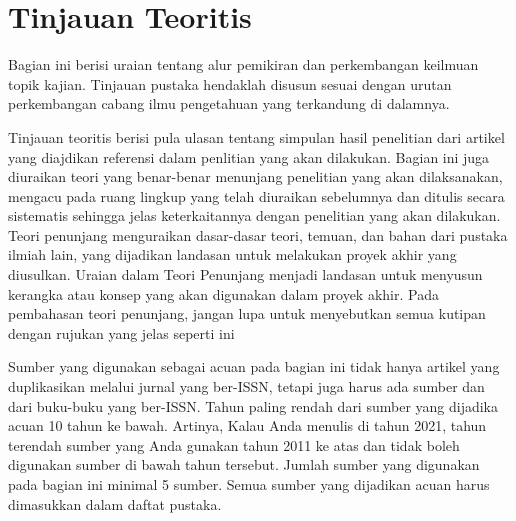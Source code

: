 \section{Tinjauan Teoritis}
Bagian ini  berisi uraian tentang alur pemikiran dan perkembangan keilmuan topik kajian. Tinjauan  pustaka  hendaklah  disusun  sesuai dengan urutan perkembangan cabang ilmu pengetahuan yang terkandung di dalamnya. 

Tinjauan teoritis berisi pula ulasan tentang simpulan  hasil penelitian  dari artikel yang diajdikan referensi dalam penlitian yang akan dilakukan.   Bagian ini juga diuraikan  teori yang benar-benar menunjang penelitian yang akan dilaksanakan, mengacu pada ruang lingkup yang telah diuraikan sebelumnya dan ditulis secara sistematis sehingga jelas keterkaitannya dengan penelitian yang akan dilakukan. Teori penunjang menguraikan dasar-dasar teori, temuan, dan bahan  dari pustaka ilmiah lain, yang dijadikan landasan untuk melakukan proyek akhir yang diusulkan. Uraian dalam Teori Penunjang menjadi landasan untuk menyusun kerangka atau konsep yang akan digunakan dalam proyek akhir. Pada pembahasan teori penunjang, jangan lupa untuk menyebutkan semua kutipan dengan rujukan yang jelas seperti ini

Sumber yang  digunakan sebagai acuan  pada bagian ini tidak hanya  artikel yang duplikasikan melalui jurnal yang ber-ISSN, tetapi juga harus ada sumber  dan dari buku-buku yang ber-ISSN. Tahun paling rendah dari sumber yang dijadika acuan 10 tahun ke bawah. Artinya, Kalau Anda menulis di tahun 2021, tahun terendah sumber yang Anda gunakan tahun 2011 ke atas dan tidak boleh digunakan sumber di bawah tahun tersebut. Jumlah sumber  yang digunakan pada bagian ini minimal 5 sumber. Semua sumber yang dijadikan acuan harus dimasukkan dalam daftat pustaka.